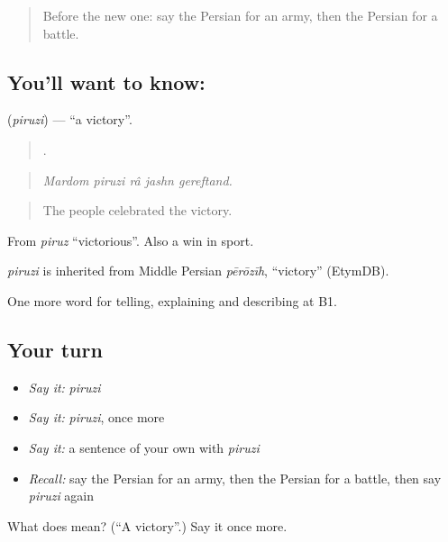 \begin{quote}
Before the new one: say the Persian for an army, then the Persian for a battle.
\end{quote}

\subsection*{You'll want to know: }
\textbf{} (\emph{piruzi}) — \textquotedblleft{}a victory\textquotedblright{}.

\begin{quote}
    .
\end{quote}

\begin{quote}
\emph{Mardom piruzi râ jashn gereftand.}
\end{quote}

\begin{quote}
The people celebrated the victory.
\end{quote}

From \emph{piruz} \textquotedblleft{}victorious\textquotedblright{}. Also a win in sport.

\begin{cousinweb}
\emph{piruzi} is inherited from Middle Persian \emph{pērōzīh}, \textquotedblleft{}victory\textquotedblright{} (EtymDB).
\end{cousinweb}

\begin{grammarlens}[title={What you've built}]
One more word for telling, explaining and describing at B1.
\end{grammarlens}

\subsection*{Your turn}
\begin{itemize}
\raggedright
  \item \emph{Say it:} \emph{piruzi}
  \item \emph{Say it:} \emph{piruzi}, once more
  \item \emph{Say it:} a sentence of your own with \emph{piruzi}
  \item \emph{Recall:} say the Persian for an army, then the Persian for a battle, then say \emph{piruzi} again
\end{itemize}

\begin{tcolorbox}[breakable,colback=teal!4,colframe=teal!35!black,title={Before you move on}]
What does  mean? (\textquotedblleft{}A victory\textquotedblright{}.) Say it once more.
\end{tcolorbox}
